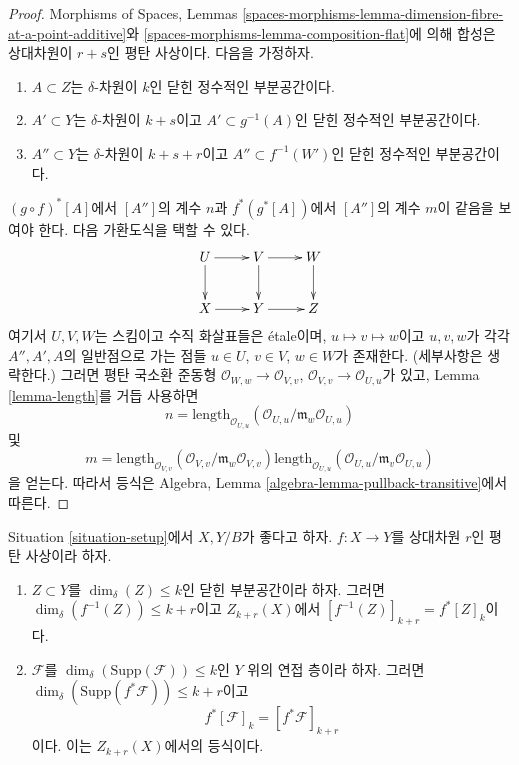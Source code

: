 \begin{proof}
Morphisms of Spaces, Lemmas
\ref{spaces-morphisms-lemma-dimension-fibre-at-a-point-additive}와
\ref{spaces-morphisms-lemma-composition-flat}에 의해 합성은 상대차원이
$r + s$인 평탄 사상이다. 다음을 가정하자.
\begin{enumerate}
\item $A \subset Z$는 $\delta$-차원이 $k$인 닫힌 정수적인 부분공간이다.
\item $A' \subset Y$는 $\delta$-차원이 $k + s$이고
$A' \subset g^{-1}(A)$인 닫힌 정수적인 부분공간이다.
\item $A'' \subset Y$는 $\delta$-차원이 $k + s + r$이고
$A'' \subset f^{-1}(W')$인 닫힌 정수적인 부분공간이다.
\end{enumerate}
$(g \circ f)^*[A]$에서 $[A'']$의 계수 $n$과
$f^*(g^*[A])$에서 $[A'']$의 계수 $m$이 같음을 보여야 한다.
다음 가환도식을 택할 수 있다.
$$
\xymatrix{
U \ar[d] \ar[r] & V \ar[d] \ar[r] & W \ar[d] \\
X \ar[r] & Y \ar[r] & Z
}
$$
여기서 $U, V, W$는 스킴이고 수직 화살표들은 \'etale이며,
$u \mapsto v \mapsto w$이고 $u, v, w$가 각각 $A'', A', A$의
일반점으로 가는 점들 $u \in U$, $v \in V$, $w \in W$가 존재한다.
(세부사항은 생략한다.) 그러면 평탄 국소환 준동형
$\mathcal{O}_{W, w} \to \mathcal{O}_{V, v}$,
$\mathcal{O}_{V, v} \to \mathcal{O}_{U, u}$가 있고,
Lemma \ref{lemma-length}를 거듭 사용하면
$$
n = \text{length}_{\mathcal{O}_{U, u}}(
\mathcal{O}_{U, u}/\mathfrak m_w\mathcal{O}_{U, u})
$$
및
$$
m =
\text{length}_{\mathcal{O}_{V, v}}(
\mathcal{O}_{V, v}/\mathfrak m_w\mathcal{O}_{V, v})
\text{length}_{\mathcal{O}_{U, u}}(
\mathcal{O}_{U, u}/\mathfrak m_v\mathcal{O}_{U, u})
$$
을 얻는다. 따라서 등식은 Algebra, Lemma
\ref{algebra-lemma-pullback-transitive}에서 따른다.
\end{proof}

\begin{lemma}
\label{lemma-pullback-coherent}
Situation \ref{situation-setup}에서 $X, Y/B$가 좋다고 하자.
$f : X \to Y$를 상대차원 $r$인 평탄 사상이라 하자.
\begin{enumerate}
\item $Z \subset Y$를 $\dim_\delta(Z) \leq k$인 닫힌 부분공간이라
하자. 그러면 $\dim_\delta(f^{-1}(Z)) \leq k + r$이고
$Z_{k + r}(X)$에서
$[f^{-1}(Z)]_{k + r} = f^*[Z]_k$이다.
\item $\mathcal{F}$를
$\dim_\delta(\text{Supp}(\mathcal{F})) \leq k$인 $Y$ 위의 연접
층이라 하자. 그러면
$\dim_\delta(\text{Supp}(f^*\mathcal{F})) \leq k + r$이고
$$
f^*[{\mathcal F}]_k = [f^*{\mathcal F}]_{k+r}
$$
이다. 이는 $Z_{k + r}(X)$에서의 등식이다.
\end{enumerate}
\end{lemma}

